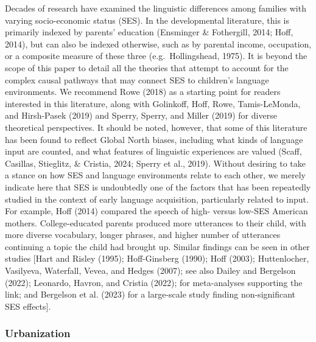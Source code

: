 \documentclass[
  man,floatsintext]{apa6}
\begin{document}
Decades of research have examined the linguistic differences among families with varying socio-economic status (SES). In the developmental literature, this is primarily indexed by parents' education (Ensminger \& Fothergill, 2014; Hoff, 2014), but can also be indexed otherwise, such as by parental income, occupation, or a composite measure of these three (e.g.~Hollingshead, 1975).
It is beyond the scope of this paper to detail all the theories that attempt to account for the complex causal pathways that may connect SES to children's language environments. We recommend Rowe (2018) as a starting point for readers interested in this literature, along with Golinkoff, Hoff, Rowe, Tamis-LeMonda, and Hirsh-Pasek (2019) and Sperry, Sperry, and Miller (2019) for diverse theoretical perspectives. It should be noted, however, that some of this literature has been found to reflect Global North biases, including what kinds of language input are counted, and what features of linguistic experiences are valued (Scaff, Casillas, Stieglitz, \& Cristia, 2024; Sperry et al., 2019). Without desiring to take a stance on how SES and language environments relate to each other, we merely indicate here that SES is undoubtedly one of the factors that has been repeatedly studied in the context of early language acquisition, particularly related to input. For example, Hoff (2014) compared the speech of high- versus low-SES American mothers. College-educated parents produced more utterances to their child, with more diverse vocabulary, longer phrases, and higher number of utterances continuing a topic the child had brought up. Similar findings can be seen in other studies {[}Hart and Risley (1995); Hoff-Ginsberg (1990); Hoff (2003); Huttenlocher, Vasilyeva, Waterfall, Vevea, and Hedges (2007); see also Dailey and Bergelson (2022); Leonardo, Havron, and Cristia (2022); for meta-analyses supporting the link; and Bergelson et al. (2023) for a large-scale study finding non-significant SES effects{]}.

\hypertarget{urbanization}{%
\subsubsection{Urbanization}\label{urbanization}}
\end{document}
